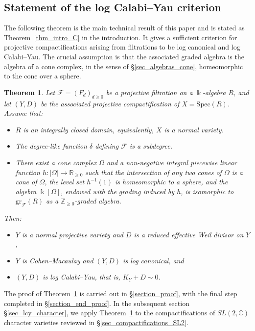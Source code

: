 \documentclass[12pt,letterpaper, reqno]{amsart}
\newtheorem{theorem}{Theorem}[section]
\theoremstyle{defstyle} \newtheorem{definition}[theorem]{Definition}
\theoremstyle{remark}
\numberwithin{equation}{section}
\numberwithin{figure}{section}
\newcommand{\cF} {\mathcal{F}}
\newcommand{\Spec} {\mathrm{Spec}}
\newcommand{\gr} {\mathrm{gr}}
\newcommand{\kk} {\Bbbk}
\newcommand{\CC} {\mathbb{C}}
\newcommand{\RR} {\mathbb{R}}
\newcommand{\ZZ} {\mathbb{Z}}
\begin{document}
\subsection{Statement of the log Calabi--Yau criterion}
\label{sec_lcy_statement}

The following theorem is the main technical result of this paper and is stated as Theorem~\ref{thm_intro_C} in the introduction. It gives a sufficient criterion for projective compactifications arising from filtrations to be log canonical and log Calabi--Yau. The crucial assumption is that the associated graded algebra is the algebra of a cone complex, in the sense of \S\ref{sec_algebras_cone}, homeomorphic to the cone over a sphere.


\begin{theorem}\label{thm_main_C}
Let $\cF=(F_d)_{d\geq 0}$ be a projective filtration on a $\kk$-algebra $R$, and let $(Y,D)$ be the associated projective compactification of $X=\Spec(R)$. Assume that:
\begin{itemize}
\item[(i)] $R$ is an integrally closed domain, equivalently, $X$ is a normal variety.
\item[(ii)] The degree-like function $\delta$ defining $\cF$ is a subdegree.
\item[(iii)] There exist a cone complex $\Omega$ and a non-negative integral piecewise linear function $ h:|\Omega|\longrightarrow \RR_{\geq 0}$ such that the intersection of any two cones of $\Omega$ is a cone of $\Omega$, the level set $h^{-1}(1)$ is homeomorphic to a sphere, and the algebra $\kk[\Omega]$, endowed with the grading induced by $h$, is isomorphic to $\gr_{\cF}(R)$ as a $\ZZ_{\geq 0}$-graded algebra.
\end{itemize}
Then:
\begin{itemize}
\item[(i)] $Y$ is a normal projective variety and $D$ is a reduced effective Weil divisor on $Y$,
\item[(ii)] $Y$ is Cohen--Macaulay and $(Y,D)$ is log canonical, and
\item[(iii)] $(Y,D)$ is log Calabi--Yau, that is, $K_Y+D\sim 0$.
\end{itemize}
\end{theorem}

The proof of Theorem~\ref{thm_main_C} is carried out in \S\ref{section_proof}, with the final step completed in \S\ref{section_end_proof}. In the subsequent section  \S\ref{sec_lcy_character}, we apply Theorem~\ref{thm_main_C} to the compactifications of $SL(2,\CC)$ character varieties reviewed in \S \ref{sec_compactifications_SL2}.
\end{document}
